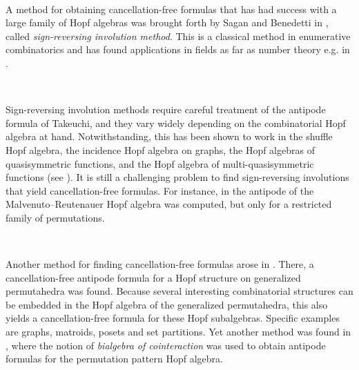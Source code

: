 \documentclass[12pt, reqno]{amsart}
\theoremstyle{definition}
\begin{document}


\

A method for obtaining cancellation-free formulas that has had success with a large family of Hopf algebras was brought forth by Sagan and Benedetti in \cite{BS2017}, called \textit{sign-reversing involution method}.
This is a classical method in enumerative combinatorics and has found applications in fields as far as number theory e.g. in \cite{zagier2009one}.


\

Sign-reversing involution methods require careful treatment of the antipode formula of Takeuchi, and they vary widely depending on the combinatorial Hopf algebra at hand.
Notwithstanding, this has been shown to work in the shuffle Hopf algebra, the incidence Hopf algebra on graphs, the Hopf algebras of quasisymmetric functions, and the Hopf algebra of multi-quasisymmetric functions (see \cite{BS2017}). It is still a challenging problem to find sign-reversing involutions that yield cancellation-free formulas.
For instance, in \cite{MalvenutoReutenauer,xu2022cancellation} the antipode of the Malvenuto–Reutenauer Hopf algebra was computed, but only for a restricted family of permutations.

\

Another method for finding cancellation-free formulas arose in \cite{aguiar2017hopf}.
There, a cancellation-free antipode formula for a Hopf structure on generalized permutahedra was found. 
Because several interesting combinatorial structures can be embedded in the Hopf algebra of the generalized permutahedra, this also yields a cancellation-free formula for these Hopf subalgebras.
Specific examples are graphs, matroids, posets and set partitions.
Yet another method was found in \cite{Foissy}, where the notion of \emph{bialgebra of cointeraction} was used to obtain antipode formulas for the permutation pattern Hopf algebra.

\
\end{document}
